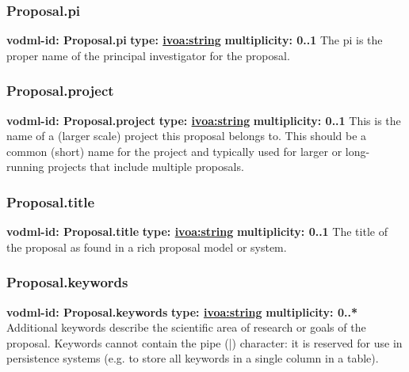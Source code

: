     \subsubsection{Proposal.pi}
      \textbf{vodml-id: Proposal.pi} \newline
      \textbf{type: \hyperref[sect:ivoa]{ivoa:string}} \newline
      \textbf{multiplicity: 0..1} \newline
      The pi is the proper name of the principal investigator for the proposal.

    \subsubsection{Proposal.project}
      \textbf{vodml-id: Proposal.project} \newline
      \textbf{type: \hyperref[sect:ivoa]{ivoa:string}} \newline
      \textbf{multiplicity: 0..1} \newline
      This is the name of a (larger scale) project this proposal belongs to. This should be a common (short) name for the project and typically used for larger or long-running projects that include multiple proposals.

    \subsubsection{Proposal.title}
      \textbf{vodml-id: Proposal.title} \newline
      \textbf{type: \hyperref[sect:ivoa]{ivoa:string}} \newline
      \textbf{multiplicity: 0..1} \newline
      The title of the proposal as found in a rich proposal model or system.

    \subsubsection{Proposal.keywords}
      \textbf{vodml-id: Proposal.keywords} \newline
      \textbf{type: \hyperref[sect:ivoa]{ivoa:string}} \newline
      \textbf{multiplicity: 0..*} \newline
      Additional keywords describe the scientific area of research or goals of the proposal. Keywords cannot contain the pipe (|) character: it is reserved for use in persistence systems (e.g. to store all keywords in a single column in a table).

